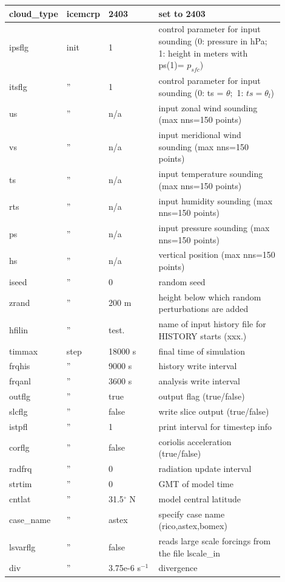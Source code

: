 \documentclass[11pt,a4paper]{article}
\begin{document}
\begin{longtable}[htb]{p{0.1\linewidth}p{0.1\linewidth}p{0.2\linewidth}p{0.5\linewidth}}
cloud\_type&icemcrp&2403&set to 2403\\
\hline
ipsflg&  init  & 1   & control parameter for input sounding (0: pressure
in hPa; 1: height in meters with ps(1)= $p_{sfc}$) \\
itsflg&  ''  & 1   & control parameter for input sounding (0: ts =
$\theta;$ 1: $ts = \theta_l$) \\
us    &  ''  & n/a & input zonal wind sounding (max nns=150 points) \\
vs    &  ''  & n/a & input meridional wind sounding (max nns=150
points) \\
ts    &  ''  & n/a & input temperature sounding (max nns=150 points) \\
rts   &  ''  & n/a & input humidity sounding (max nns=150 points) \\
ps    &  ''  & n/a & input pressure sounding (max nns=150 points) \\
hs    &  ''  & n/a & vertical position (max nns=150 points) \\
iseed &  ''  & 0   &  random seed \\
zrand &  ''  & 200 m & height below which random perturbations are added \\
hfilin & ''  & test. & name of input history file for HISTORY starts (xxx.)\\
\hline
timmax & step& 18000 s  &  final time of simulation \\ 
frqhis    & '' & 9000 s &  history write interval \\
frqanl    & '' & 3600 s &  analysis write interval  \\
outflg    & '' & true   &  output flag (true/false) \\
slcflg    & '' & false  &  write slice output (true/false) \\ 
istpfl    & '' & 1 &  print interval for timestep info \\
corflg    & '' & false   &  coriolis acceleration (true/false) \\
radfrq    & '' & 0   &  radiation update interval \\
strtim    & '' & 0   &  GMT of model time \\
cntlat    & '' & 31.5$^{\circ}$ N &  model central latitude \\
case\_name    & '' & astex &  specify case name (rico,astex,bomex)\\
lsvarflg  & '' & false & reads large scale forcings from the file lscale\_in\\
div       & '' & 3.75e-6 s$^{-1}$ & divergence\\

\end{longtable}
\end{document}
